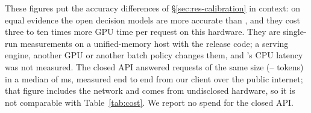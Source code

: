These figures put the accuracy differences of \S\ref{sec:res-calibration} in context: on equal evidence the open
decision models are more accurate than \orb, and they cost three to ten times more GPU time per request on this %
hardware. They are single-run measurements on a unified-memory host with the release code; a serving engine,
another GPU or another batch policy changes them, and \orb's CPU latency was not measured. The closed API answered
requests of the same size (\ctJevFourKTokLo--\ctJevFourKTokHi{} tokens) in a median of \ctJevFourKMedian{} ms,
measured end to end from our client over the public internet; that figure includes the network and comes from
undisclosed hardware, so it is not comparable with Table~\ref{tab:cost}. We report no spend for the closed API.
